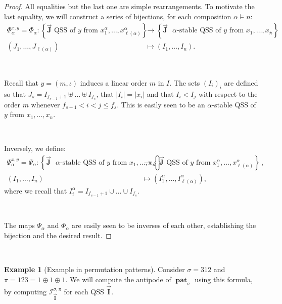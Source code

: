 \documentclass[12pt, reqno]{amsart}
\theoremstyle{definition}
\newtheorem{smpl}[thm]{Example}
\newcommand{\III}{\vec{\mathbf{I}}}
\newcommand{\JJJ}{\vec{\mathbf{J}}}
\DeclareMathOperator{\pat}{\mathbf{pat}}
\begin{document}
\begin{proof}
All equalities but the last one are simple rearrangements.
To motivate the last equality, we will construct a series of bijections, for each composition $\alpha \models n$:
\begin{align*}
    \Phi_{\alpha}^{x, y} = \Phi_{\alpha} : \left\{ \JJJ \text{ QSS of $y$ from $x^{\alpha}_1, \dots, x^{\alpha}_{\ell(\alpha)}$}\right\} &\to \left\{ \JJJ \text{ $\alpha$-stable QSS of $y$ from $x_1, \dots, x_n$}\right\}\, , \\
    (J_1, \dots, J_{\ell(\alpha)} ) &\mapsto (I_1, \dots , I_n).
\end{align*}

\

Recall that $y = (m, \iota)$ induces a linear order $m$ in $I$.
The sets $(I_i)_i$ are defined so that $J_s = I_{f_{s-1}+1} \uplus \dots \uplus I_{f_s}$, that $|I_i | = |x_i|$ and that $I_i < I_j $ with respect to the order $m$ whenever $f_{s-1} < i < j \leq f_{s}$.
This is easily seen to be an $\alpha$-stable QSS of $y$ from $x_1, \dots, x_n$.

\

Inversely, we define:
\begin{align*}
    \Psi_{\alpha}^{x, y} = \Psi_{\alpha}  : \left\{ \JJJ \text{ $\alpha$-stable QSS of $y$ from $x_1, \dots, x_n$}\right\} &\to \left\{ \JJJ \text{ QSS of $y$ from $x^{\alpha}_1, \dots, x^{\alpha}_{\ell(\alpha)}$}\right\} \, , \\
    (I_1, \dots , I_n) &\mapsto (I_1^{\alpha}, \dots, I^{\alpha}_{\ell(\alpha)} ),
\end{align*}
where we recall that $I^{\alpha}_i = I_{f_{s-1}+1} \cup \dots  \cup I_{f_s}$.

\

The maps $\Psi_{\alpha}$ and $\Phi_{\alpha}$ are easily seen to be inverses of each other, establishing the bijection and the desired result.
\end{proof}

\

\begin{smpl}[Example in permutation patterns]
Consider $\sigma = 312$ and $\pi = 123 = 1\oplus 1 \oplus 1$.
We will compute the antipode of $\pat_{\sigma}$ using this formula, by computing $\mathcal I^{\sigma, \pi}_{\III}$ for each QSS $\III$.

\end{smpl}
\end{document}
